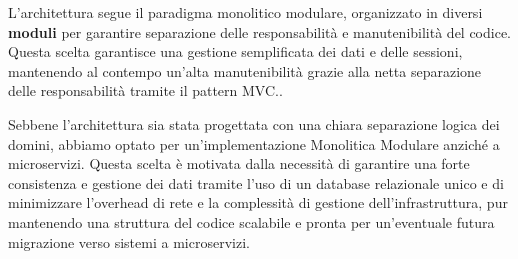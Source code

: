 \documentclass{article}
\begin{document}
\vspace{0.25cm} %
\noindent %
L’architettura segue il paradigma monolitico modulare, organizzato in diversi \textbf{moduli} per garantire separazione delle responsabilità e manutenibilità del codice. Questa scelta garantisce una gestione semplificata dei dati e delle sessioni, mantenendo al contempo un'alta manutenibilità grazie alla netta separazione delle responsabilità tramite il pattern MVC..

\vspace{0.25cm} %
\noindent %

\vspace{0.25cm} %
\noindent %
\begin{tcolorbox}[colback=gray!10,colframe=black,title=Nota architetturale]
    Sebbene l'architettura sia stata progettata con una chiara separazione logica dei domini, abbiamo optato per un'implementazione Monolitica Modulare anziché a microservizi. Questa scelta è motivata dalla necessità di garantire una forte consistenza e gestione dei dati tramite l'uso di un database relazionale unico e di minimizzare l'overhead di rete e la complessità di gestione dell'infrastruttura, pur mantenendo una struttura del codice scalabile e pronta per un'eventuale futura migrazione verso sistemi a microservizi.
\end{tcolorbox}
\end{document}
